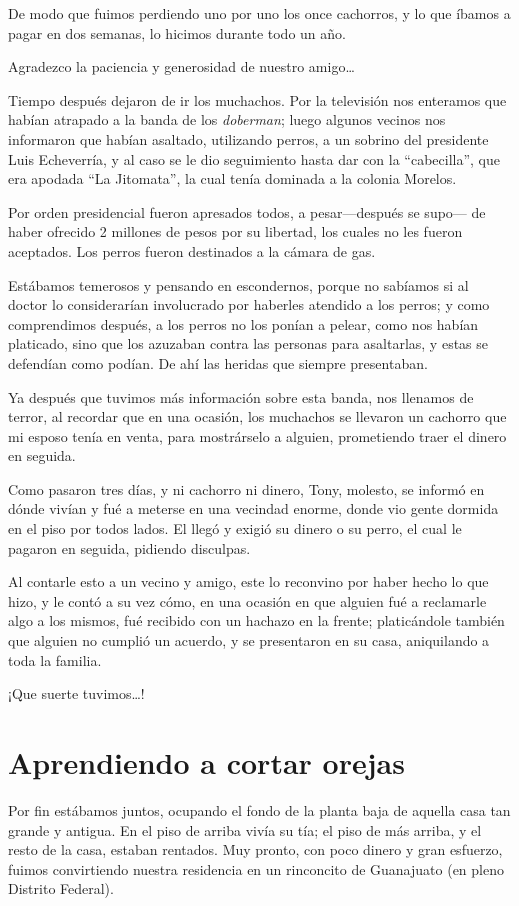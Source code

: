 \documentclass[letterpaper, 12pt]{book}
\begin{document}
De modo que fuimos perdiendo uno por uno los once cachorros, y lo que íbamos a pagar en dos semanas, lo hicimos durante todo un año.

Agradezco la paciencia y generosidad de nuestro amigo\ldots

Tiempo después dejaron de ir los muchachos. Por la televisión nos enteramos que habían atrapado a la banda de los \textit{doberman}; luego algunos vecinos nos informaron que habían asaltado, utilizando perros, a un sobrino del presidente Luis Echeverría, y al caso se le dio seguimiento hasta dar con la ``cabecilla'', que era apodada ``La Jitomata'', la cual tenía dominada a la colonia Morelos. 

Por orden presidencial fueron apresados todos, a pesar---después se supo--- de haber ofrecido 2 millones de pesos por su libertad, los cuales no les fueron aceptados. Los perros fueron destinados a la cámara de gas.

Estábamos temerosos y pensando en escondernos, porque no sabíamos si al doctor lo considerarían involucrado por haberles atendido a los perros; y como comprendimos después, a los perros no los ponían a pelear, como nos habían platicado, sino que los azuzaban contra las personas para asaltarlas, y estas se defendían como podían. De ahí las heridas que siempre presentaban.

Ya después que tuvimos más información sobre esta banda, nos llenamos de terror, al recordar que en una ocasión, los muchachos se llevaron un cachorro que mi esposo tenía en venta, para mostrárselo a alguien, prometiendo traer el dinero en seguida.

Como pasaron tres días, y ni cachorro ni dinero, Tony, molesto, se informó en dónde vivían y fué a meterse en una vecindad enorme, donde vio gente dormida en el piso por todos lados.  El llegó y exigió su dinero o su perro, el cual le pagaron en seguida, pidiendo disculpas.

Al contarle esto a un vecino y amigo, este lo reconvino por haber hecho lo que hizo, y le contó a su vez cómo, en una ocasión en que alguien fué a reclamarle algo a los mismos, fué recibido con un hachazo en la frente; platicándole también que alguien no cumplió un acuerdo, y se presentaron en su casa, aniquilando a toda la familia.

¡Que suerte tuvimos\ldots!

\chapter{Aprendiendo a cortar orejas}
Por fin estábamos juntos, ocupando el fondo de la planta baja de aquella casa tan grande y antigua. En el piso de arriba vivía su tía; el piso de más arriba, y el resto de la casa, estaban rentados. Muy pronto, con poco dinero y gran esfuerzo, fuimos convirtiendo nuestra residencia en un rinconcito de Guanajuato (en pleno Distrito Federal).
\end{document}
